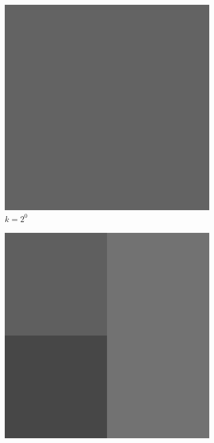 \begin{figure}[H]
    \centering
    \caption{Result Images After DHWT}
    \begin{subfigure}[b]{0.3\textwidth}
        \centering
        \includegraphics[width=\textwidth]{problem1/image_lena_24bit_1.bmp}
        \caption{$k = 2^0$}
    \end{subfigure}
    \hfill
    \begin{subfigure}[b]{0.3\textwidth}
        \centering
        \includegraphics[width=\textwidth]{problem1/image_lena_24bit_2.bmp}

\end{subfigure}
\end{figure}
